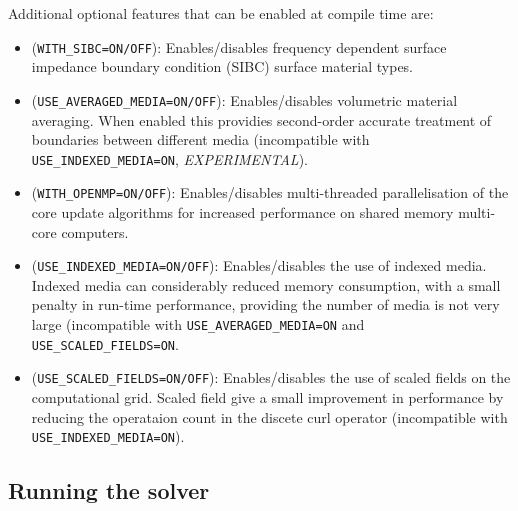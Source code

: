 \documentclass[onecolumn,a4paper]{article}
\numberwithin{equation}{section}
\begin{document}
Additional optional features that can be enabled at compile time are:
\begin{itemize}
 \item (\texttt{WITH\_SIBC=ON/OFF}): Enables/disables frequency dependent surface impedance boundary condition (SIBC) 
 surface material types.
 \item (\texttt{USE\_AVERAGED\_MEDIA=ON/OFF}): Enables/disables volumetric material averaging. When enabled this 
 providies second-order accurate treatment of boundaries between different media (incompatible with \texttt{USE\_INDEXED\_MEDIA=ON}, {\em EXPERIMENTAL}).
 \item (\texttt{WITH\_OPENMP=ON/OFF}): Enables/disables multi-threaded parallelisation of the core update algorithms 
 for increased performance on shared memory multi-core computers.
 \item (\texttt{USE\_INDEXED\_MEDIA=ON/OFF}): Enables/disables the use of indexed media. Indexed media can considerably 
 reduced memory consumption, with a small penalty in run-time performance, providing the number of media is not very large
 (incompatible with \texttt{USE\_AVERAGED\_MEDIA=ON} and \texttt{USE\_SCALED\_FIELDS=ON}.
 \item (\texttt{USE\_SCALED\_FIELDS=ON/OFF}): Enables/disables the use of scaled fields on the computational grid. Scaled
 field give a small improvement in performance by reducing the operataion count in the discete curl operator (incompatible with \texttt{USE\_INDEXED\_MEDIA=ON}).
 \end{itemize}

\subsection{Running the solver}
\end{document}
